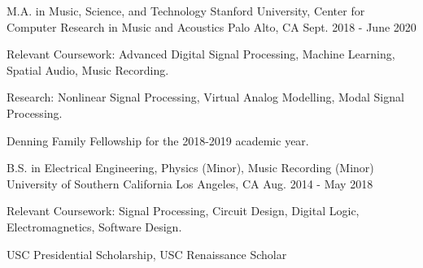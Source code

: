 

\begin{cventries}

    \cventry
    {M.A. in Music, Science, and Technology} %
    {Stanford University, Center for Computer Research in Music and Acoustics} %
    {Palo Alto, CA} %
    {Sept. 2018 - June 2020} %
    {
      \begin{cvitems} %
        \item {Relevant Coursework: Advanced Digital Signal Processing, Machine Learning, Spatial Audio, Music Recording.}
        \item {Research: Nonlinear Signal Processing, Virtual Analog Modelling, Modal Signal Processing.}
        \item {Denning Family Fellowship for the 2018-2019 academic year.}
      \end{cvitems}
    }

    \cventry
    {B.S. in Electrical Engineering, Physics (Minor), Music Recording (Minor)} %
    {University of Southern California} %
    {Los Angeles, CA} %
    {Aug. 2014 - May 2018} %
    {
      \begin{cvitems} %
        \item {Relevant Coursework: Signal Processing, Circuit Design, Digital Logic, Electromagnetics, Software Design.}
        \item {USC Presidential Scholarship, USC Renaissance Scholar}
      \end{cvitems}
    }

\end{cventries}
